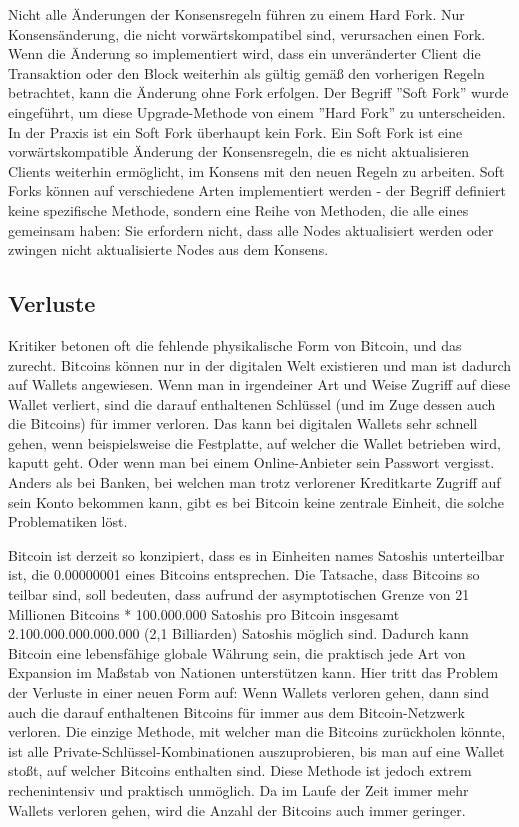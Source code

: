 Nicht alle Änderungen der Konsensregeln führen zu einem Hard Fork. Nur Konsensänderung, die nicht vorwärtskompatibel sind,
verursachen einen Fork. Wenn die Änderung so implementiert wird, dass ein unveränderter Client die Transaktion oder den
Block weiterhin als gültig gemäß den vorherigen Regeln betrachtet, kann die Änderung ohne Fork erfolgen. Der Begriff
''Soft Fork'' wurde eingeführt, um diese Upgrade-Methode von einem ''Hard Fork'' zu unterscheiden. In der Praxis ist ein Soft
Fork überhaupt kein Fork. Ein Soft Fork ist eine vorwärtskompatible Änderung der Konsensregeln, die es nicht aktualisieren
Clients weiterhin ermöglicht, im Konsens mit den neuen Regeln zu arbeiten. Soft Forks können auf verschiedene Arten implementiert
werden - der Begriff definiert keine spezifische Methode, sondern eine Reihe von Methoden, die alle eines gemeinsam haben: Sie
erfordern nicht, dass alle Nodes aktualisiert werden oder zwingen nicht aktualisierte Nodes aus dem Konsens. 

\subsection{Verluste}
Kritiker betonen oft die fehlende physikalische Form von Bitcoin, und das zurecht. Bitcoins können nur in der digitalen Welt
existieren und man ist dadurch auf Wallets angewiesen. Wenn man in irgendeiner Art und Weise Zugriff auf diese Wallet verliert,
sind die darauf enthaltenen Schlüssel (und im Zuge dessen auch die Bitcoins) für immer verloren. Das kann bei digitalen Wallets 
sehr schnell gehen, wenn beispielsweise
die Festplatte, auf welcher die Wallet betrieben wird, kaputt geht. Oder wenn man bei einem Online-Anbieter sein Passwort
vergisst. Anders als bei Banken, bei welchen man trotz verlorener Kreditkarte Zugriff auf sein Konto bekommen kann, gibt es 
bei Bitcoin keine zentrale Einheit, die solche Problematiken löst.

Bitcoin ist derzeit so konzipiert, dass es in Einheiten names Satoshis unterteilbar ist, die 0.00000001 eines Bitcoins
entsprechen. Die Tatsache, dass Bitcoins so teilbar sind, soll bedeuten, dass aufrund der asymptotischen Grenze von 21
Millionen Bitcoins * 100.000.000 Satoshis pro Bitcoin insgesamt 2.100.000.000.000.000 (2,1 Billiarden) Satoshis möglich sind.
Dadurch kann Bitcoin eine lebensfähige globale Währung sein, die praktisch jede Art von Expansion im Maßstab von Nationen 
unterstützen kann. 
Hier tritt das Problem der Verluste in einer neuen Form auf: Wenn Wallets verloren gehen, dann sind auch die 
darauf enthaltenen Bitcoins für immer aus dem Bitcoin-Netzwerk verloren. Die einzige Methode, mit welcher man die Bitcoins
zurückholen könnte, ist alle Private-Schlüssel-Kombinationen auszuprobieren, bis man auf eine Wallet stoßt, auf welcher Bitcoins
enthalten sind. Diese Methode ist jedoch extrem rechenintensiv und praktisch unmöglich. Da im Laufe der Zeit immer mehr Wallets
verloren gehen, wird die Anzahl der Bitcoins auch immer geringer.